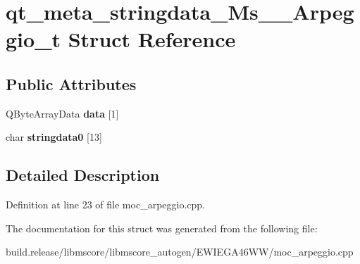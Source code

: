 \hypertarget{structqt__meta__stringdata___ms_____arpeggio__t}{}\section{qt\+\_\+meta\+\_\+stringdata\+\_\+\+Ms\+\_\+\+\_\+\+Arpeggio\+\_\+t Struct Reference}
\label{structqt__meta__stringdata___ms_____arpeggio__t}
\subsection*{Public Attributes}
\begin{DoxyCompactItemize}
\item 
\mbox{\label{structqt__meta__stringdata___ms_____arpeggio__t_a1b1a3b461b3e40b56a1a3fdefc6d9912}} 
Q\+Byte\+Array\+Data {\bfseries data} \mbox{[}1\mbox{]}
\item 
\mbox{\label{structqt__meta__stringdata___ms_____arpeggio__t_a4d71035cb091119c71dd5684e8b4106f}} 
char {\bfseries stringdata0} \mbox{[}13\mbox{]}
\end{DoxyCompactItemize}


\subsection{Detailed Description}


Definition at line 23 of file moc\+\_\+arpeggio.\+cpp.



The documentation for this struct was generated from the following file\+:\begin{DoxyCompactItemize}
\item 
build.\+release/libmscore/libmscore\+\_\+autogen/\+E\+W\+I\+E\+G\+A46\+W\+W/moc\+\_\+arpeggio.\+cpp\end{DoxyCompactItemize}
